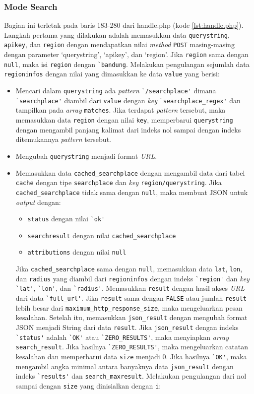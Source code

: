 \subsubsection{Mode Search}
Bagian ini terletak pada baris 183-280 dari handle.php (kode \ref{lst:handle.php}). Langkah pertama yang dilakukan adalah memasukkan data \verb!querystring!, \verb!apikey!, dan \verb!region! dengan mendapatkan nilai \textit{method} \verb!POST! masing-masing dengan parameter `querystring', `apikey', dan `region'. Jika \verb!region! sama dengan \verb!null!, maka isi \verb!region! dengan \verb!`bandung!. Melakukan pengulangan sejumlah data \verb!regioninfos! dengan nilai yang dimasukkan ke data \verb!value! yang berisi:
\begin{itemize}
	\item Mencari dalam \verb!querystring! ada \textit{pattern} \verb!`/searchplace'! dimana \verb!`searchplace'! diambil dari \verb!value! dengan \textit{key} \verb!`searchplace_regex'! dan tampilkan pada \textit{array} \verb!matches!. Jika terdapat \textit{pattern} tersebut, maka memasukkan data \verb!region! dengan nilai \verb!key!, memperbarui \verb!querystring! dengan mengambil panjang kalimat dari indeks nol sampai dengan indeks ditemukannya \textit{pattern} tersebut.
	\item Mengubah \verb!querystring! menjadi format \textit{URL}.
	\item Memasukkan data \verb!cached_searchplace! dengan mengambil data dari tabel \verb!cache! dengan tipe \verb!searchplace! dan \textit{key} \verb!region/querystring!. Jika \verb!cached_searchplace! tidak sama dengan \verb!null!, maka membuat JSON untuk \textit{output} dengan:
	\begin{itemize}
		\item \verb!status! dengan nilai \verb!`ok'!
		\item \verb!searchresult! dengan nilai \verb!cached_searchplace!
		\item \verb!attributions! dengan nilai \verb!null!
	\end{itemize}
	Jika \verb!cached_searchplace! sama dengan \verb!null!, memasukkan data \verb!lat!, \verb!lon!, dan \verb!radius! yang diambil dari \verb!regioninfos! dengan indeks \verb!`region'! dan \textit{key} \verb!`lat'!, \verb!`lon'!, dan \verb!`radius'!. Memasukkan \verb!result! dengan hasil akses \textit{URL} dari data \verb!`full_url'!. Jika \verb!result! sama dengan \verb!FALSE! atau jumlah \verb!result! lebih besar dari \verb!maximum_http_response_size!, maka mengeluarkan pesan kesalahan. 
	Setelah itu, memasukkan \verb!json_result! dengan mengubah format JSON menjadi String dari data \verb!result!. Jika \verb!json_result! dengan indeks \verb!`status'! adalah \verb!`OK'! atau \verb!`ZERO_RESULTS'!, maka menyiapkan \textit{array} \verb!search_result!. Jika hasilnya \verb!`ZERO_RESULTS'!, maka mengeluarkan catatan kesalahan dan memperbarui data \verb!size! menjadi 0. Jika hasilnya \verb!`OK'!, maka mengambil angka minimal antara banyaknya data \verb!json_result! dengan indeks \verb!`results'! dan \verb!search_maxresult!. Melakukan pengulangan dari nol sampai dengan \verb!size! yang dinisialkan dengan \verb!i!:

\end{itemize}
